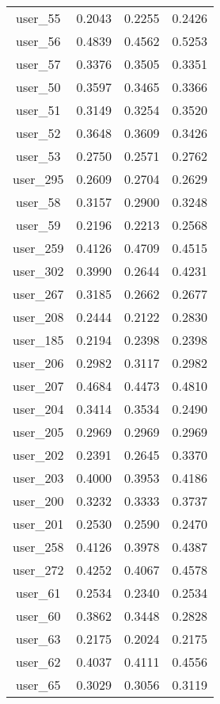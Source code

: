 \begin{table}[ht]
\begin{tabular}{|c|c|c|c|}
user_55  &  0.2043   &  0.2255   &  0.2426 \\ 
user_56  &  0.4839   &  0.4562   &  0.5253 \\ 
user_57  &  0.3376   &  0.3505   &  0.3351 \\ 
user_50  &  0.3597   &  0.3465   &  0.3366 \\ 
user_51  &  0.3149   &  0.3254   &  0.3520 \\ 
user_52  &  0.3648   &  0.3609   &  0.3426 \\ 
user_53  &  0.2750   &  0.2571   &  0.2762 \\ 
user_295  &  0.2609   &  0.2704   &  0.2629 \\ 
user_58  &  0.3157   &  0.2900   &  0.3248 \\ 
user_59  &  0.2196   &  0.2213   &  0.2568 \\ 
user_259  &  0.4126   &  0.4709   &  0.4515 \\ 
user_302  &  0.3990   &  0.2644   &  0.4231 \\ 
user_267  &  0.3185   &  0.2662   &  0.2677 \\ 
user_208  &  0.2444   &  0.2122   &  0.2830 \\ 
user_185  &  0.2194   &  0.2398   &  0.2398 \\ 
user_206  &  0.2982   &  0.3117   &  0.2982 \\ 
user_207  &  0.4684   &  0.4473   &  0.4810 \\ 
user_204  &  0.3414   &  0.3534   &  0.2490 \\ 
user_205  &  0.2969   &  0.2969   &  0.2969 \\ 
user_202  &  0.2391   &  0.2645   &  0.3370 \\ 
user_203  &  0.4000   &  0.3953   &  0.4186 \\ 
user_200  &  0.3232   &  0.3333   &  0.3737 \\ 
user_201  &  0.2530   &  0.2590   &  0.2470 \\ 
user_258  &  0.4126   &  0.3978   &  0.4387 \\ 
user_272  &  0.4252   &  0.4067   &  0.4578 \\ 
user_61  &  0.2534   &  0.2340   &  0.2534 \\ 
user_60  &  0.3862   &  0.3448   &  0.2828 \\ 
user_63  &  0.2175   &  0.2024   &  0.2175 \\ 
user_62  &  0.4037   &  0.4111   &  0.4556 \\ 
user_65  &  0.3029   &  0.3056   &  0.3119 \\ 

\end{tabular}
\end{table}
